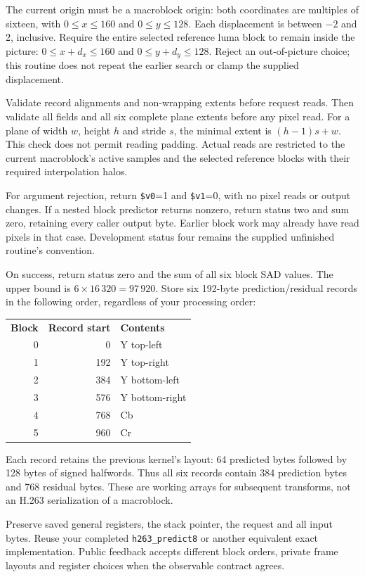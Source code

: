 The current origin must be a macroblock origin: both coordinates are multiples
of sixteen, with $0\leq x\leq160$ and $0\leq y\leq128$. Each displacement is
between $-2$ and $2$, inclusive. Require the entire selected reference luma block
to remain inside the picture: $0\leq x+d_x\leq160$ and
$0\leq y+d_y\leq128$. Reject an out-of-picture choice; this routine does not
repeat the earlier search or clamp the supplied displacement.

Validate record alignments and non-wrapping extents before request reads. Then
validate all fields and all six complete plane extents before any pixel read.
For a plane of width $w$, height $h$ and stride $s$, the minimal extent is
$(h-1)s+w$. This check does not permit reading padding. Actual reads are restricted
to the current macroblock's active samples and the selected reference blocks
with their required interpolation halos.

For argument rejection, return \texttt{\$v0}=1 and \texttt{\$v1}=0, with no
pixel reads or output changes. If a nested block predictor returns nonzero,
return status two and sum zero, retaining every caller output byte. Earlier
block work may already have read pixels in that case. Development status four
remains the supplied unfinished routine's convention.

On success, return status zero and the sum of all six block SAD values.
The upper bound is $6\times16\,320=97\,920$. Store six 192-byte prediction/residual
records in the following order, regardless of your processing order:
\begin{center}
  \begin{tabular}{rrl}
    \textbf{Block} & \textbf{Record start} & \textbf{Contents} \\
    0              & 0                     & Y top-left        \\
    1              & 192                   & Y top-right       \\
    2              & 384                   & Y bottom-left     \\
    3              & 576                   & Y bottom-right    \\
    4              & 768                   & Cb                \\
    5              & 960                   & Cr
  \end{tabular}
\end{center}
Each record retains the previous kernel's layout: 64 predicted bytes followed
by 128 bytes of signed halfwords. Thus all six records contain 384 prediction
bytes and 768 residual bytes. These are working arrays for subsequent transforms,
not an H.263 serialization of a macroblock.

Preserve saved general registers, the stack pointer, the request and all input
bytes. Reuse your completed \texttt{h263\_predict8} or another equivalent exact
implementation. Public feedback accepts different block orders, private frame
layouts and register choices when the observable contract agrees.
